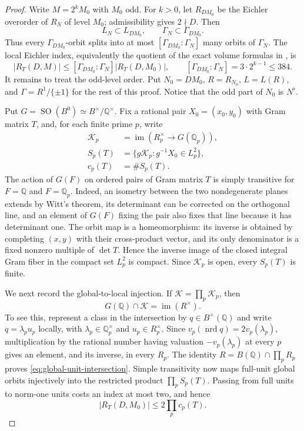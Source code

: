 \documentclass[11pt,reqno]{amsart}
\theoremstyle{definition}
\newcommand{\Q}{\mathbb Q}
\newcommand{\nrd}{\operatorname{nrd}}
\newcommand{\Kc}{\mathcal K}
\begin{document}
\begin{proof}
Write $M=2^kM_0$ with $M_0$ odd.  For $k>0$, let $R_{DM_0}$ be the Eichler
overorder of $R_N$ of level $M_0$; admissibility gives $2\nmid D$.  Then
\[
 L_N\subset L_{DM_0},\qquad \Gamma_N\subset\Gamma_{DM_0}.
\]
Thus every $\Gamma_{DM_0}$-orbit splits into at most
$[\Gamma_{DM_0}:\Gamma_N]$ many orbits of $\Gamma_N$.  The local Eichler
index, equivalently the quotient of the exact volume formulas in
\cite[Equation (2.7)]{BruinierLiMoller}, is
\begin{equation}\label{eq:two-index}
 |R_T(D,M)|\leq[\Gamma_{DM_0}:\Gamma_N]|R_T(D,M_0)|,
 \qquad
 [\Gamma_{DM_0}:\Gamma_N]=3\cdot2^{k-1}\leq384.
\end{equation}
It remains to treat the odd-level order.  Put
$N_0=DM_0$, $R=R_{N_0}$, $L=L(R)$, and
$\Gamma=R^1/\{\pm1\}$ for the rest of this proof.  Notice that the odd
part of $N_0$ is $N^\flat$.

Put $G=\operatorname{SO}(B^0)\simeq B^\times/\Q^\times$.  Fix a rational
pair $X_0=(x_0,y_0)$ with Gram matrix $T$, and, for each finite prime $p$,
write
\[
 \begin{aligned}
  \Kc_p&=\operatorname{im}(R_p^\times\longrightarrow G(\Q_p)),\\
  S_p(T)&=\{g\Kc_p:g^{-1}X_0\in L_p^2\},\\
  c_p(T)&=\#S_p(T).
 \end{aligned}
\]
The action of $G(F)$ on ordered pairs of Gram matrix $T$ is simply
transitive for $F=\Q$ and $F=\Q_p$.  Indeed, an isometry between the two
nondegenerate planes extends by Witt's theorem, its determinant can be
corrected on the orthogonal line, and an element of $G(F)$ fixing the pair
also fixes that line because it has determinant one.  The orbit map is a
homeomorphism: its inverse is obtained by completing $(x,y)$ with their
cross-product vector, and its only denominator is a fixed nonzero multiple
of $\det T$.  Hence the inverse image of the closed integral Gram fiber in
the compact set $L_p^2$ is compact.  Since $\Kc_p$ is open, every
$S_p(T)$ is finite.

We next record the global-to-local injection.  If $\Kc=\prod_p\Kc_p$, then
\begin{equation}\label{eq:global-unit-intersection}
 G(\Q)\cap\Kc=\operatorname{im}(R^\times).
\end{equation}
To see this, represent a class in the intersection by $q\in B^\times(\Q)$
and write $q=\lambda_pu_p$ locally, with
$\lambda_p\in\Q_p^\times$ and $u_p\in R_p^\times$.  Since
$v_p(\nrd q)=2v_p(\lambda_p)$, multiplication by the rational number having
valuation $-v_p(\lambda_p)$ at every $p$ gives an element, and its inverse,
in every $R_p$.  The identity
$R=B(\Q)\cap\prod_pR_p$ proves \eqref{eq:global-unit-intersection}.
Simple transitivity now maps full-unit global orbits injectively into the
restricted product $\prod_pS_p(T)$.  Passing from full units to norm-one units costs an index
at most two, and hence
\begin{equation}\label{eq:local-coset-product}
 |R_T(D,M_0)|\leq2\prod_pc_p(T).
\end{equation}


\end{proof}
\end{document}
